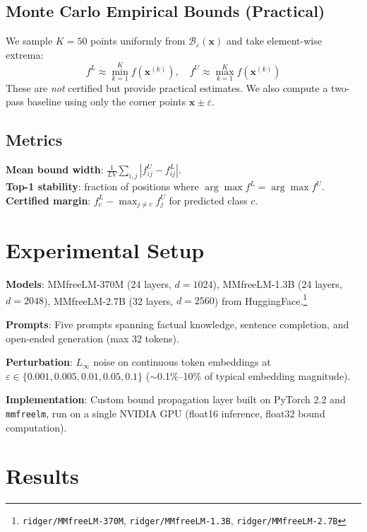 \documentclass[11pt]{article}
\begin{document}
\subsection{Monte Carlo Empirical Bounds (Practical)}

We sample $K=50$ points uniformly from $\mathcal{B}_\varepsilon(\mathbf{x})$ and take element-wise extrema:
\begin{equation}
f^L \approx \min_{k=1}^K f(\mathbf{x}^{(k)}), \quad f^U \approx \max_{k=1}^K f(\mathbf{x}^{(k)})
\end{equation}
These are \emph{not} certified but provide practical estimates. We also compute a two-pass baseline using only the corner points $\mathbf{x} \pm \varepsilon$.

\subsection{Metrics}

\textbf{Mean bound width}: $\frac{1}{LV}\sum_{i,j} |f^U_{ij} - f^L_{ij}|$. \\
\textbf{Top-1 stability}: fraction of positions where $\arg\max f^L = \arg\max f^U$. \\
\textbf{Certified margin}: $f^L_c - \max_{j \neq c} f^U_j$ for predicted class $c$.

\section{Experimental Setup}

\textbf{Models}: MMfreeLM-370M (24 layers, $d{=}1024$), MMfreeLM-1.3B (24 layers, $d{=}2048$), MMfreeLM-2.7B (32 layers, $d{=}2560$) from HuggingFace.\footnote{\texttt{ridger/MMfreeLM-370M}, \texttt{ridger/MMfreeLM-1.3B}, \texttt{ridger/MMfreeLM-2.7B}}

\textbf{Prompts}: Five prompts spanning factual knowledge, sentence completion, and open-ended generation (max 32 tokens).

\textbf{Perturbation}: $L_\infty$ noise on continuous token embeddings at $\varepsilon \in \{0.001, 0.005, 0.01, 0.05, 0.1\}$ ($\sim$0.1\%--10\% of typical embedding magnitude).

\textbf{Implementation}: Custom bound propagation layer built on PyTorch 2.2 and \texttt{mmfreelm}, run on a single NVIDIA GPU (float16 inference, float32 bound computation).

\section{Results}
\end{document}
